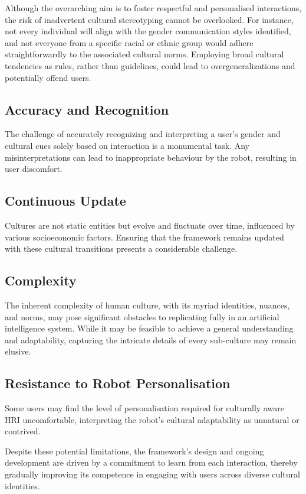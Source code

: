 Although the overarching aim is to foster respectful and personalised interactions, the risk of inadvertent cultural stereotyping cannot be overlooked. For instance, not every individual will align with the gender communication styles identified, and not everyone from a specific racial or ethnic group would adhere straightforwardly to the associated cultural norms. Employing broad cultural tendencies as rules, rather than guidelines, could lead to overgeneralizations and potentially offend users.

\subsection{Accuracy and Recognition}

The challenge of accurately recognizing and interpreting a user's gender and cultural cues solely based on interaction is a monumental task. Any misinterpretations can lead to inappropriate behaviour by the robot, resulting in user discomfort.

\subsection{Continuous Update}

Cultures are not static entities but evolve and fluctuate over time, influenced by various socioeconomic factors. Ensuring that the framework remains updated with these cultural transitions presents a considerable challenge.

\subsection{Complexity}

The inherent complexity of human culture, with its myriad identities, nuances, and norms, may pose significant obstacles to replicating fully in an artificial intelligence system. While it may be feasible to achieve a general understanding and adaptability, capturing the intricate details of every sub-culture may remain elusive.

\subsection{Resistance to Robot Personalisation}

Some users may find the level of personalisation required for culturally aware HRI uncomfortable, interpreting the robot's cultural adaptability as unnatural or contrived.

Despite these potential limitations, the framework's design and ongoing development are driven by a commitment to learn from each interaction, thereby gradually improving its competence in engaging with users across diverse cultural identities. 